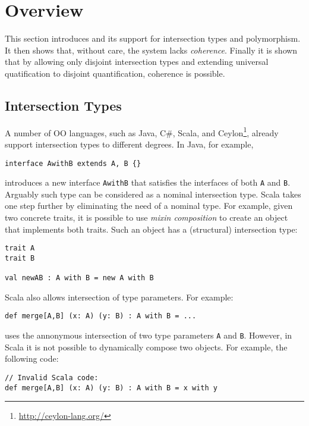 \section{Overview}

This section introduces \name and its support for intersection types
and polymorphism. It then shows that, without care, the system
lacks \emph{coherence}. Finally it is shown that by allowing only
disjoint intersection types and extending universal quatification to
disjoint quantification, coherence is possible.

\subsection{Intersection Types}

A number of OO languages, such as Java, C\#, Scala, and
Ceylon\footnote{\url{http://ceylon-lang.org/}}, already support intersection
types to different degrees. In Java, for example,

\begin{lstlisting}
interface AwithB extends A, B {}
\end{lstlisting}

\noindent introduces a new interface \lstinline{AwithB} that satisfies the interfaces of
both \lstinline{A} and \lstinline{B}. Arguably such type can be considered as a nominal
intersection type. Scala takes one step further by eliminating the
need of a nominal type. For example, given two concrete traits, it is possible to
use \emph{mixin composition} to create an object that implements both
traits. Such an object has a (structural) intersection type:

\begin{lstlisting}
trait A
trait B

val newAB : A with B = new A with B
\end{lstlisting}

\noindent Scala also allows intersection of type parameters. For example:
\begin{lstlisting}
def merge[A,B] (x: A) (y: B) : A with B = ...
\end{lstlisting}
uses the annonymous intersection of two type parameters \lstinline{A} and
\lstinline{B}. However, in Scala it is not possible to dynamically
compose two objects. For example, the following code:

\begin{lstlisting}
// Invalid Scala code:
def merge[A,B] (x: A) (y: B) : A with B = x with y
\end{lstlisting}

